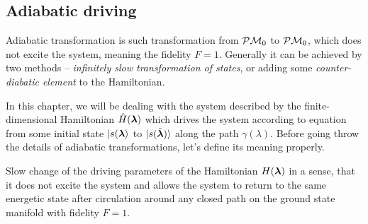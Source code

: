 \subsection{Adiabatic driving}
Adiabatic transformation is such transformation from $\mathcal{P}\mathcal{M} _0$ to $\mathcal{P}\mathcal{M}_0$, which does not excite the system, meaning the fidelity $F=1$. Generally it can be achieved by two methods -- \emph{infinitely slow transformation of states}, or adding some \emph{counter-diabatic element} to the Hamiltonian.


In this chapter, we will be dealing with the system described by the finite-dimensional Hamiltonian $\hat{H}({\bm\lambda})$ which drives the system according to \Schrodinger equation from some initial state $\ket{s({\bm\lambda}}$ to $\ket{s(\tilde{{\bm\lambda}})}$ along the path $\gamma(\lambda)$. Before going throw the details of adiabatic transformations, let's define its meaning properly.

\begin{definition}[Adibaticity]
    Slow change of the driving parameters of the Hamiltonian $H({\bm\lambda})$ in a sense, that it does not excite the system and allows the system to return to the same energetic state after circulation around any closed path on the ground state manifold with fidelity $F=1$. 
\end{definition}


